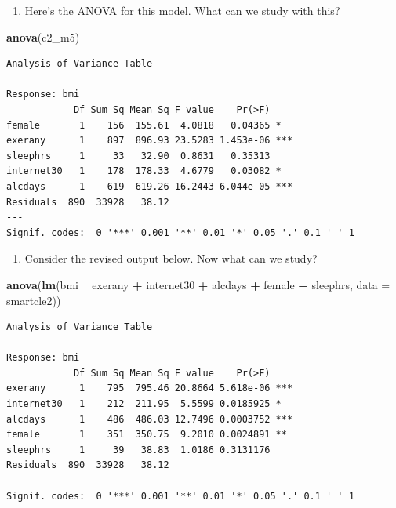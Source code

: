 \documentclass[]{book}
\newenvironment{Shaded}{\begin{snugshade}}{\end{snugshade}}
\newcommand{\KeywordTok}[1]{\textcolor[rgb]{0.13,0.29,0.53}{\textbf{#1}}}
\newcommand{\DataTypeTok}[1]{\textcolor[rgb]{0.13,0.29,0.53}{#1}}
\newcommand{\StringTok}[1]{\textcolor[rgb]{0.31,0.60,0.02}{#1}}
\newcommand{\OperatorTok}[1]{\textcolor[rgb]{0.81,0.36,0.00}{\textbf{#1}}}
\newcommand{\NormalTok}[1]{#1}
\providecommand{\tightlist}{%
  \setlength{\itemsep}{0pt}\setlength{\parskip}{0pt}}
\theoremstyle{definition}
\theoremstyle{definition}
\theoremstyle{definition}
\theoremstyle{remark}
\begin{document}
\begin{enumerate}
\def\labelenumi{\arabic{enumi}.}
\tightlist
\item
  Here's the ANOVA for this model. What can we study with this?
\end{enumerate}

\begin{Shaded}
\begin{Highlighting}[]
\KeywordTok{anova}\NormalTok{(c2_m5)}
\end{Highlighting}
\end{Shaded}

\begin{verbatim}
Analysis of Variance Table

Response: bmi
            Df Sum Sq Mean Sq F value    Pr(>F)    
female       1    156  155.61  4.0818   0.04365 *  
exerany      1    897  896.93 23.5283 1.453e-06 ***
sleephrs     1     33   32.90  0.8631   0.35313    
internet30   1    178  178.33  4.6779   0.03082 *  
alcdays      1    619  619.26 16.2443 6.044e-05 ***
Residuals  890  33928   38.12                      
---
Signif. codes:  0 '***' 0.001 '**' 0.01 '*' 0.05 '.' 0.1 ' ' 1
\end{verbatim}

\begin{enumerate}
\def\labelenumi{\arabic{enumi}.}
\setcounter{enumi}{1}
\tightlist
\item
  Consider the revised output below. Now what can we study?
\end{enumerate}

\begin{Shaded}
\begin{Highlighting}[]
\KeywordTok{anova}\NormalTok{(}\KeywordTok{lm}\NormalTok{(bmi }\OperatorTok{~}\StringTok{ }\NormalTok{exerany }\OperatorTok{+}\StringTok{ }\NormalTok{internet30 }\OperatorTok{+}\StringTok{ }\NormalTok{alcdays }\OperatorTok{+}\StringTok{ }\NormalTok{female }\OperatorTok{+}\StringTok{ }\NormalTok{sleephrs,}
         \DataTypeTok{data =}\NormalTok{ smartcle2))}
\end{Highlighting}
\end{Shaded}

\begin{verbatim}
Analysis of Variance Table

Response: bmi
            Df Sum Sq Mean Sq F value    Pr(>F)    
exerany      1    795  795.46 20.8664 5.618e-06 ***
internet30   1    212  211.95  5.5599 0.0185925 *  
alcdays      1    486  486.03 12.7496 0.0003752 ***
female       1    351  350.75  9.2010 0.0024891 ** 
sleephrs     1     39   38.83  1.0186 0.3131176    
Residuals  890  33928   38.12                      
---
Signif. codes:  0 '***' 0.001 '**' 0.01 '*' 0.05 '.' 0.1 ' ' 1
\end{verbatim}
\end{document}
